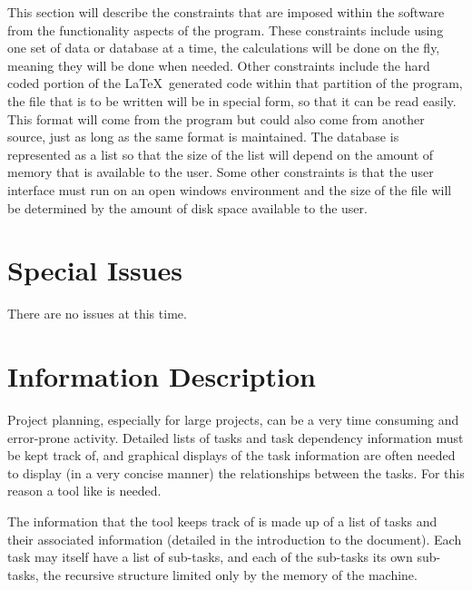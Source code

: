 This section will describe the constraints that are imposed within the
software from the functionality aspects of the program. These
constraints include using one set of data or database at a time, the
calculations will be done on the fly, meaning they will be done when
needed. Other constraints include the hard coded portion of the
\LaTeX\ generated code within that partition of the program, the file
that is to be written will be in special form, so that it can be read
easily. This format will come from the program but could also come
from another source, just as long as the same format is maintained.
The database is represented as a list so that the size of the list
will depend on the amount of memory that is available to the user.
Some other constraints is that the user interface must run on an open
windows environment and the size of the file will be determined by the
amount of disk space available to the user.

%
%
%
%
\section{Special Issues}

 There are no issues at this time.



%
%
\section{Information Description}

Project planning, especially for large projects, can be a very time
consuming and error-prone activity.  Detailed lists of tasks and task
dependency information must be kept track of, and graphical displays
of the task information are often needed to display (in a very concise
manner) the relationships between the tasks.  For this reason a tool
like \xplan\/ is needed.

The information that the tool keeps track of is made up of a list of
tasks and their associated information (detailed in the introduction
to the document).  Each task may itself have a list of sub-tasks, and
each of the sub-tasks its own sub-tasks, the recursive structure
limited only by the memory of the machine.

